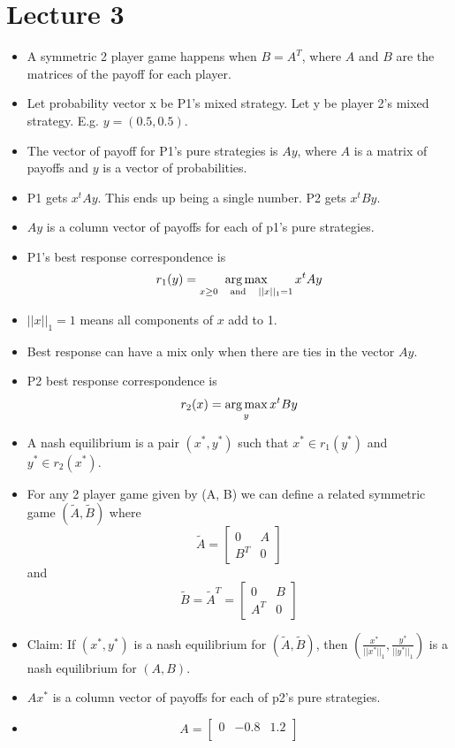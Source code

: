 \documentclass{article}
\begin{document}
\section*{Lecture 3}
\begin{itemize}
  \item A symmetric 2 player game happens when $B = A^T$, where $A$ and $B$ are the matrices of the payoff for each player.
  \item Let probability vector x be P1's mixed strategy. Let y be player 2's mixed strategy. E.g. $y=(0.5, 0.5)$.
  \item The vector of payoff for P1's pure strategies is $Ay$, where $A$ is a matrix of payoffs and $y$ is a vector of probabilities.
  \item P1 gets $x^tAy$. This ends up being a single number. P2 gets $x^tBy$.
  \item $Ay$ is a column vector of payoffs for each of p1's pure strategies.
  \item P1's best response correspondence is \[r_1(y)=\operatorname*{arg\,max}_{x \ge 0 \quad\text{and}\quad ||x||_1 = 1}x^tAy\]
  \item $||x||_1=1$ means all components of $x$ add to 1.
  \item Best response can have a mix only when there are ties in the vector $Ay$.
  \item P2 best response correspondence is \[r_2(x)=\operatorname*{arg\,max}_y x^tBy\]
  \item A nash equilibrium is a pair $(x^*, y^*)$ such that $x^* \in r_1(y^*)$ and $y^* \in r_2(x^*)$.
  \item For any 2 player game given by (A, B) we can define a related symmetric game $(\tilde{A}, \tilde{B})$ where \[\tilde{A} = \begin{bmatrix} 0 & A \\ B^T & 0 \end{bmatrix}\] and \[\tilde{B} = \tilde{A}^T = \begin{bmatrix} 0 & B \\ A^T & 0 \end{bmatrix}\]
  \item Claim: If $(x^*, y^*)$ is a nash equilibrium for $(\tilde{A}, \tilde{B})$, then $(\frac{x^*}{||x^*||_1}, \frac{y^*}{||y^*||_1})$ is a nash equilibrium for $(A, B)$.
  \item $Ax^*$ is a column vector of payoffs for each of p2's pure strategies.
  \item \[A = \begin{bmatrix}
    0 & -0.8 & 1.2 \\

\end{bmatrix}\]
\end{itemize}
\end{document}
